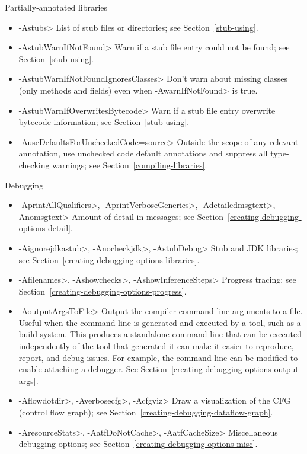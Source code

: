 Partially-annotated libraries
\begin{itemize}
\item \<-Astubs>
  List of stub files or directories; see Section~\ref{stub-using}.
\item \<-AstubWarnIfNotFound>
  Warn if a stub file entry could not be found; see Section~\ref{stub-using}.
\item \<-AstubWarnIfNotFoundIgnoresClasses>
  Don't warn about missing classes (only methods and fields) even when \<-AwarnIfNotFound> is true.
\item \<-AstubWarnIfOverwritesBytecode>
  Warn if a stub file entry overwrite bytecode information; see
  Section~\ref{stub-using}.
\item \<-AuseDefaultsForUncheckedCode=source>
  Outside the scope of any relevant
   annotation, use unchecked code
  default annotations and suppress all type-checking warnings; see
  Section~\ref{compiling-libraries}.
\end{itemize}

Debugging
\begin{itemize}
\item
 \<-AprintAllQualifiers>,
 \<-AprintVerboseGenerics>,
 \<-Adetailedmsgtext>,
 \<-Anomsgtext>
Amount of detail in messages; see Section~\ref{creating-debugging-options-detail}.

\item
 \<-Aignorejdkastub>,
 \<-Anocheckjdk>,
 \<-AstubDebug>
Stub and JDK libraries; see Section~\ref{creating-debugging-options-libraries}.

\item
 \<-Afilenames>,
 \<-Ashowchecks>,
 \<-AshowInferenceSteps>
Progress tracing; see Section~\ref{creating-debugging-options-progress}.

\item
\<-AoutputArgsToFile>
Output the compiler command-line arguments to a file.  Useful when the
command line is generated and executed by a tool, such as a build system.
This produces a standalone command line that can be executed independently
of the tool that generated it can make it easier to reproduce, report, and
debug issues.  For example, the command line can be modified to enable
attaching a debugger.
See Section~\ref{creating-debugging-options-output-args}.

\item
 \<-Aflowdotdir>,
 \<-Averbosecfg>,
 \<-Acfgviz>
 Draw a visualization of the CFG (control flow graph); see
 Section~\ref{creating-debugging-dataflow-graph}.

\item
 \<-AresourceStats>,
 \<-AatfDoNotCache>,
 \<-AatfCacheSize>
Miscellaneous debugging options; see Section~\ref{creating-debugging-options-misc}.

\end{itemize}


